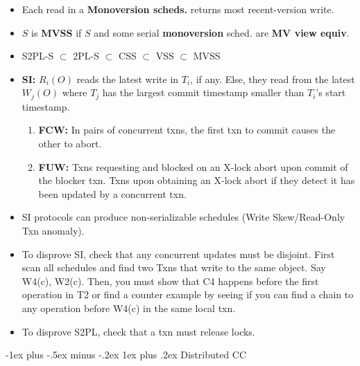 \documentclass[8pt, landscape]{extarticle}
\makeatletter
\renewcommand{\subsubsection}{\@startsection{subsubsection}{3}{0mm}%
  {-1ex plus -.5ex minus -.2ex}%
  {1ex plus .2ex}%
{\normalfont\small\bfseries}}%
\makeatother
\begin{document}
\begin{multicols*}{4}
\begin{itemize}
    \item Each read in a \textbf{Monoversion scheds.} returns most recent-version write.
    \item $S$ is \textbf{MVSS} if $S$ and some serial \textbf{monoversion} sched. are \textbf{MV view equiv}.
    \item S2PL-S $\subset$ 2PL-S $\subset$ CSS $\subset$ VSS $\subset$ MVSS
    \\
    \item \textbf{SI:} $R_i(O)$ reads the latest write in $T_i$, if any. Else, they read from the latest $W_j(O)$ where $T_j$ has the largest commit timestamp smaller than $T_i$'s start timestamp.
    \begin{enumerate}
        \item \textbf{FCW:} In pairs of concurrent txns, the first txn to commit causes the other to abort.
        \item \textbf{FUW:} Txns requesting and blocked on an X-lock abort upon commit of the blocker txn. Txns upon obtaining an X-lock abort if they detect it has been updated by a concurrent txn.
    \end{enumerate}
    \item SI protocols can produce non-serializable schedules (Write Skew/Read-Only Txn anomaly).
    \item To disprove SI, check that any concurrent updates must be disjoint. First scan all schedules and find two Txns that write to the same object. Say W4(c), W2(c). Then, you must show that C4 happens before the first operation in T2 or find a counter example by seeing if you can find a chain to any operation before W4(c) in the same local txn.
    \item To disprove S2PL, check that a txn must release locks.
\end{itemize}

\subsubsection{Distributed CC}


\end{multicols*}
\end{document}

